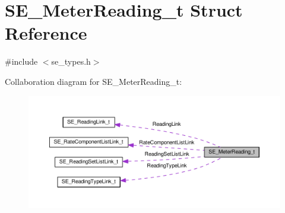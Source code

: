 \hypertarget{structSE__MeterReading__t}{}\section{S\+E\+\_\+\+Meter\+Reading\+\_\+t Struct Reference}
\label{structSE__MeterReading__t}


{\ttfamily \#include $<$se\+\_\+types.\+h$>$}



Collaboration diagram for S\+E\+\_\+\+Meter\+Reading\+\_\+t\+:\nopagebreak
\begin{figure}[H]
\begin{center}
\leavevmode
\includegraphics[width=350pt]{structSE__MeterReading__t__coll__graph}
\end{center}
\end{figure}
